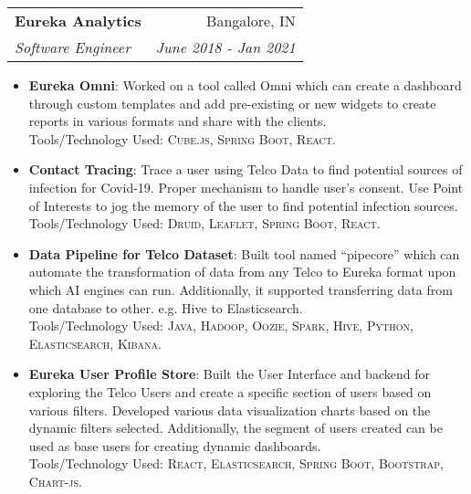 \documentclass[letterpaper,11pt]{article}
\makeatletter
\newcommand{\resumeItem}[2]{
  \item\small{
    \textbf{#1}{: #2 \vspace{-2pt}}
  }
}
\newcommand{\resumeSubheading}[4]{
  \vspace{-1pt}\item
    \begin{tabular*}{0.97\textwidth}[t]{l@{\extracolsep{\fill}}r}
      \textbf{#1} & #2 \\
      \textit{\small#3} & \textit{\small #4} \\
    \end{tabular*}\vspace{-5pt}
}
\newcommand{\resumeItemListStart}{\begin{itemize}}
\newcommand{\resumeItemListEnd}{\end{itemize}\vspace{-5pt}}
\makeatother
\begin{document}
    \resumeSubheading
    {Eureka Analytics}{Bangalore, IN}
    {Software Engineer}{June 2018 -  Jan 2021}
    \resumeItemListStart
        \resumeItem{Eureka Omni}{Worked on a tool called Omni which can create a dashboard through custom templates and add pre-existing or new widgets to create reports in various formats and share with the clients.  \\ Tools/Technology Used: \textsc{Cube.js, Spring Boot, React}.}
        \resumeItem{Contact Tracing}{Trace a user using Telco Data to find potential sources of infection for Covid-19. Proper mechanism to handle user's consent. Use Point of Interests to jog the memory of the user to find potential infection sources. \\ Tools/Technology Used: \textsc{Druid, Leaflet, Spring Boot, React}.}
        \resumeItem{Data Pipeline for Telco Dataset}
          {Built tool named ``pipecore'' which can automate the transformation of data from any Telco to Eureka format upon which AI engines can run. Additionally, it supported transferring data from one database to other.  e.g. Hive to Elasticsearch. \\ Tools/Technology Used: \textsc{Java, Hadoop, Oozie, Spark, Hive, Python, Elasticsearch, Kibana}.}
          \resumeItem{Eureka User Profile Store}
          {Built the User Interface and backend for exploring the Telco Users and create a specific section of users based on various filters. Developed various data visualization charts based on the dynamic filters selected.  Additionally, the segment of users created can be used as base users for creating dynamic dashboards. \\ Tools/Technology Used: \textsc{React, Elasticsearch, Spring Boot, Bootstrap, Chart-js}.}
      \resumeItemListEnd
\end{document}
